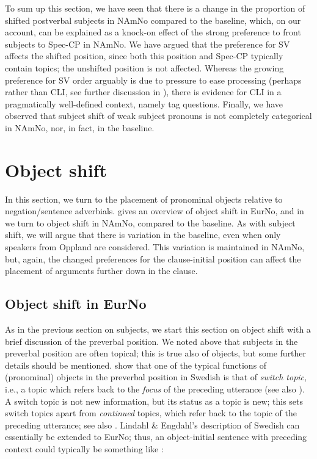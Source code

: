 \documentclass[output=paper]{langscibook}
\begin{document}
To sum up this section, we have seen that there is a change in the proportion of shifted postverbal subjects in NAmNo compared to the baseline, which, on our account, can be explained as a knock-on effect of the strong preference to front subjects to Spec-CP in NAmNo. We have argued that the preference for SV affects the shifted position, since both this position and Spec-CP typically contain topics; the unshifted position is not affected. Whereas the growing preference for SV order arguably is due to pressure to ease processing (perhaps rather than CLI, see further discussion in ), there is evidence for CLI in a pragmatically well-defined context, namely tag questions. Finally, we have observed that subject shift of weak subject pronouns is not completely categorical in NAmNo, nor, in fact, in the baseline.

\section{Object shift}\label{sec:larsson:4}

In this section, we turn to the placement of pronominal objects relative to negation/sentence adverbials.  gives an overview of object shift in EurNo, and in  we turn to object shift in NAmNo, compared to the baseline. As with subject shift, we will argue that there is variation in the baseline, even when only speakers from Oppland are considered. This variation is maintained in NAmNo, but, again, the changed preferences for the clause\hyp initial position can affect the placement of arguments further down in the clause.

\subsection{Object shift in EurNo}\label{sec:larsson:4.1}

As in the previous section on subjects, we start this section on object shift with a brief discussion of the preverbal position. We noted above that subjects in the preverbal position are often topical; this is true also of objects, but some further details should be mentioned. \citet{LindahlEngdahl2022} show that one of the typical functions of (pronominal) objects in the preverbal position in Swedish is that of \textit{switch topic}, i.e., a topic which refers back to the \textit{focus} of the preceding utterance (see also \citealt{BentzenAnderssen2019}). A switch topic is not new information, but its status as a topic is new; this sets switch topics apart from \textit{continued} topics, which refer back to the topic of the preceding utterance; see also \citet{FrascarelliHinterhölzl2007}. Lindahl \& Engdahl’s description of Swedish can essentially be extended to EurNo; thus, an object-initial sentence with preceding context could typically be something like :
\end{document}
